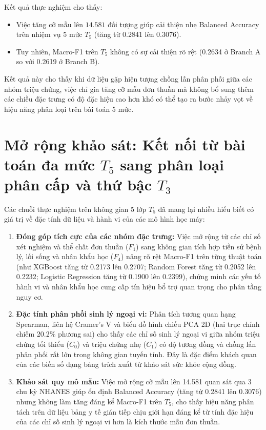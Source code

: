 Kết quả thực nghiệm cho thấy:
\begin{itemize}
    \item Việc tăng cỡ mẫu lên $14.581$ đối tượng giúp cải thiện nhẹ Balanced Accuracy trên nhiệm vụ 5 mức $T_5$ (tăng từ 0.2841 lên 0.3076).
    \item Tuy nhiên, Macro-F1 trên $T_5$ không có sự cải thiện rõ rệt (0.2634 ở Branch A so với 0.2619 ở Branch B).
\end{itemize}
Kết quả này cho thấy khi dữ liệu gặp hiện tượng chồng lấn phân phối giữa các nhóm triệu chứng, việc chỉ gia tăng cỡ mẫu đơn thuần mà không bổ sung thêm các chiều đặc trưng có độ đặc hiệu cao hơn khó có thể tạo ra bước nhảy vọt về hiệu năng phân loại trên bài toán 5 mức.

\section{Mở rộng khảo sát: Kết nối từ bài toán đa mức $T_5$ sang phân loại phân cấp và thứ bậc $T_3$}
\label{sec:chuyen-dich-t5-t3}

Các chuỗi thực nghiệm trên không gian 5 lớp $T_5$ đã mang lại nhiều hiểu biết có giá trị về đặc tính dữ liệu và hành vi của các mô hình học máy:
\begin{enumerate}
    \item \textbf{Đóng góp tích cực của các nhóm đặc trưng:} Việc mở rộng từ các chỉ số xét nghiệm và thể chất đơn thuần ($F_1$) sang không gian tích hợp tiền sử bệnh lý, lối sống và nhân khẩu học ($F_4$) nâng rõ rệt Macro-F1 trên từng thuật toán (như XGBoost tăng từ 0.2173 lên 0.2707; Random Forest tăng từ 0.2052 lên 0.2232; Logistic Regression tăng từ 0.1900 lên 0.2399), chứng minh các yếu tố hành vi và nhân khẩu học cung cấp tín hiệu bổ trợ quan trọng cho phân tầng nguy cơ.
    \item \textbf{Đặc tính phân phối sinh lý ngoại vi:} Phân tích tương quan hạng Spearman, liên hệ Cramer's V và biểu đồ hình chiếu PCA 2D (hai trục chính chiếm 20.2\% phương sai) cho thấy các chỉ số sinh lý ngoại vi giữa nhóm triệu chứng tối thiểu ($C_0$) và triệu chứng nhẹ ($C_1$) có độ tương đồng và chồng lấn phân phối rất lớn trong không gian tuyến tính. Đây là đặc điểm khách quan của các biến số dạng bảng trích xuất từ khảo sát sức khỏe cộng đồng.
    \item \textbf{Khảo sát quy mô mẫu:} Việc mở rộng cỡ mẫu lên 14.581 quan sát qua 3 chu kỳ NHANES giúp ổn định Balanced Accuracy (tăng từ 0.2841 lên 0.3076) nhưng không làm tăng đáng kể Macro-F1 trên $T_5$, cho thấy hiệu năng phân tách trên dữ liệu bảng y tế gián tiếp chịu giới hạn đáng kể từ tính đặc hiệu của các chỉ số sinh lý ngoại vi hơn là kích thước mẫu đơn thuần.
\end{enumerate}

